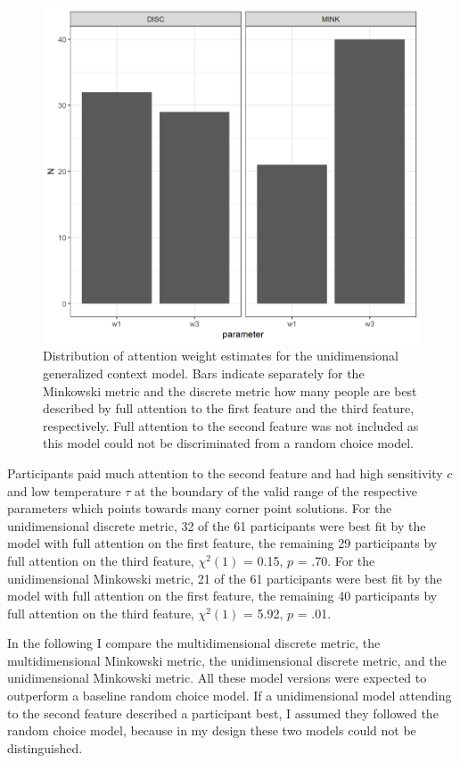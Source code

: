\documentclass[a4paper,man,natbib]{apa6}
\begin{document}
\begin{figure}
\centering
\includegraphics[width = \textwidth]{fig_par_unidim.png}
\caption{Distribution of attention weight estimates for the unidimensional generalized context model. Bars indicate separately for the Minkowski metric and the discrete metric how many people are best described by full attention to the first feature and the third feature, respectively. Full attention to the second feature was not included as this model could not be discriminated from a random choice model.}
\label{fig:par_unidim}
\end{figure}

Participants paid much attention to the second feature and had high sensitivity $c$ and low temperature $\tau$ at the boundary of the valid range of the respective parameters which points towards many corner point solutions. For the unidimensional discrete metric, 32 of the 61 participants were best fit by the model with full attention on the first feature, the remaining 29 participants by full attention on the third feature, $\chi^{2}(1)$ = 0.15, $p$ = .70. For the unidimensional Minkowski metric, 21 of the 61 participants were best fit by the model with full attention on the first feature, the remaining 40 participants by full attention on the third feature, $\chi^{2}(1)$ = 5.92, $p$ = .01.

In the following I compare the multidimensional discrete metric, the multidimensional Minkowski metric, the unidimensional discrete metric, and the unidimensional Minkowski metric. All these model versions were expected to outperform a baseline random choice model. If a unidimensional model attending to the second feature described a participant best, I assumed they followed the random choice model, because in my design these two models could not be distinguished. 
\end{document}
